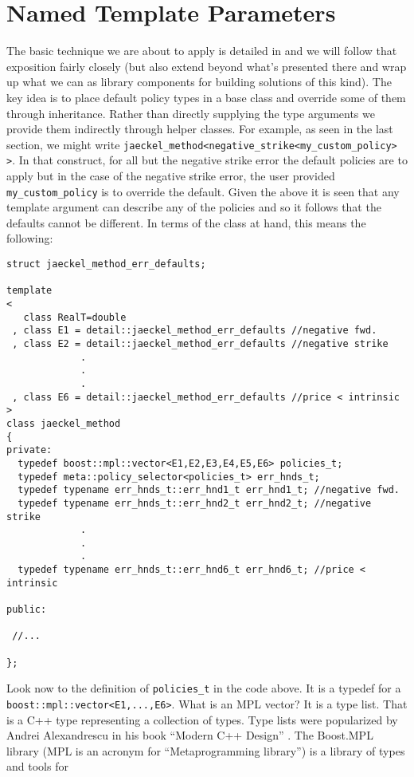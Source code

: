 \documentclass[a4paper,twoside,twocolumn]{article}
\begin{document}
\section{Named Template Parameters}
The basic technique we are about to apply is detailed in
\citep{vandjosu} and we will follow that exposition fairly closely
(but also extend beyond what's presented there and wrap up what we can
as library components for building solutions of this kind). The key
idea is to place default policy types in a base class and override
some of them through inheritance. Rather than directly supplying the
type arguments we provide them indirectly through helper classes. For
example, as seen in the last section, we might write
\verb|jaeckel_method<negative_strike<my_custom_policy> >|.  In that
construct, for all but the negative strike error the default policies
are to apply but in the case of the negative strike error, the user
provided \verb|my_custom_policy| is to override the default. Given the
above it is seen that any template argument can describe any of the
policies and so it follows that the defaults cannot be different. In
terms of the class at hand, this means the following:
\begin{verbatim}
struct jaeckel_method_err_defaults;

template
<
   class RealT=double
 , class E1 = detail::jaeckel_method_err_defaults //negative fwd.
 , class E2 = detail::jaeckel_method_err_defaults //negative strike
             .
             .
             .
 , class E6 = detail::jaeckel_method_err_defaults //price < intrinsic
>
class jaeckel_method
{
private:
  typedef boost::mpl::vector<E1,E2,E3,E4,E5,E6> policies_t;
  typedef meta::policy_selector<policies_t> err_hnds_t;
  typedef typename err_hnds_t::err_hnd1_t err_hnd1_t; //negative fwd.
  typedef typename err_hnds_t::err_hnd2_t err_hnd2_t; //negative strike
             .
             .
             .
  typedef typename err_hnds_t::err_hnd6_t err_hnd6_t; //price < intrinsic

public:

 //...

};
\end{verbatim}
Look now to the definition of \verb|policies_t| in the code above. It
is a typedef for a \verb|boost::mpl::vector<E1,...,E6>|. What is an
MPL vector? It is a type list. That is a C++ type representing a
collection of types. Type lists were popularized by Andrei
Alexandrescu in his book ``Modern C++ Design''
\citep{alexandrescu}. The Boost.MPL library (MPL is an acronym for
``Metaprogramming library'') is a library of types and tools for
\end{document}
